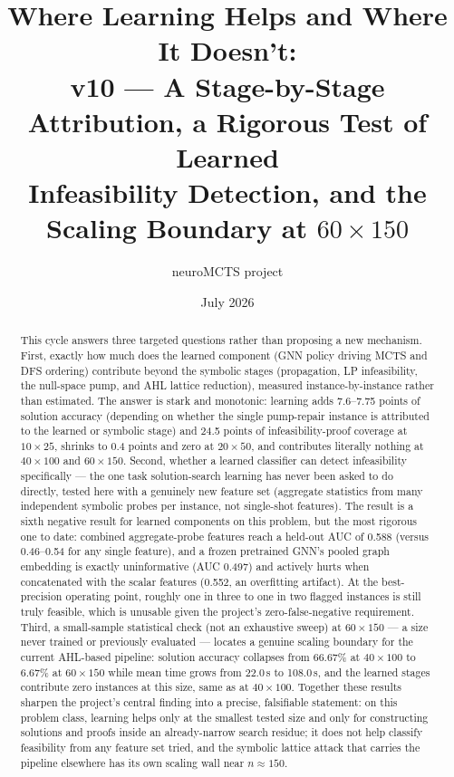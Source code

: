 \documentclass[12pt]{article}
\title{Where Learning Helps and Where It Doesn't:\\
v10 --- A Stage-by-Stage Attribution, a Rigorous Test of Learned\\
Infeasibility Detection, and the Scaling Boundary at $60 \times 150$}
\author{neuroMCTS project}
\date{July 2026}
\begin{document}
\maketitle

\begin{abstract}
This cycle answers three targeted questions rather than proposing a new mechanism. First, exactly how much does the learned component (GNN policy driving MCTS and DFS ordering) contribute beyond the symbolic stages (propagation, LP infeasibility, the null-space pump, and AHL lattice reduction), measured instance-by-instance rather than estimated. The answer is stark and monotonic: learning adds 7.6--7.75 points of solution accuracy (depending on whether the single pump-repair instance is attributed to the learned or symbolic stage) and 24.5 points of infeasibility-proof coverage at $10 \times 25$, shrinks to 0.4 points and zero at $20 \times 50$, and contributes literally nothing at $40 \times 100$ and $60 \times 150$. Second, whether a learned classifier can detect infeasibility specifically --- the one task solution-search learning has never been asked to do directly, tested here with a genuinely new feature set (aggregate statistics from many independent symbolic probes per instance, not single-shot features). The result is a sixth negative result for learned components on this problem, but the most rigorous one to date: combined aggregate-probe features reach a held-out AUC of 0.588 (versus 0.46--0.54 for any single feature), and a frozen pretrained GNN's pooled graph embedding is exactly uninformative (AUC 0.497) and actively hurts when concatenated with the scalar features (0.552, an overfitting artifact). At the best-precision operating point, roughly one in three to one in two flagged instances is still truly feasible, which is unusable given the project's zero-false-negative requirement. Third, a small-sample statistical check (not an exhaustive sweep) at $60 \times 150$ --- a size never trained or previously evaluated --- locates a genuine scaling boundary for the current AHL-based pipeline: solution accuracy collapses from 66.67\% at $40 \times 100$ to 6.67\% at $60 \times 150$ while mean time grows from 22.0\,s to 108.0\,s, and the learned stages contribute zero instances at this size, same as at $40 \times 100$. Together these results sharpen the project's central finding into a precise, falsifiable statement: on this problem class, learning helps only at the smallest tested size and only for constructing solutions and proofs inside an already-narrow search residue; it does not help classify feasibility from any feature set tried, and the symbolic lattice attack that carries the pipeline elsewhere has its own scaling wall near $n \approx 150$.
\end{abstract}
\end{document}
